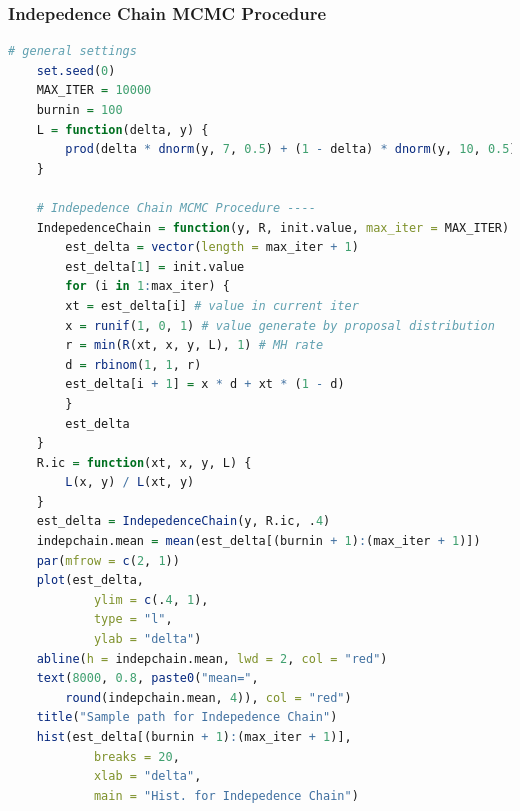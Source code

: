 \documentclass[11pt]{article}
\begin{document}
\subsubsection{Indepedence Chain MCMC Procedure}\label{sec:mhic}
\begin{lstlisting}[language=R] 
    # general settings
    set.seed(0)
    MAX_ITER = 10000
    burnin = 100
    L = function(delta, y) {
        prod(delta * dnorm(y, 7, 0.5) + (1 - delta) * dnorm(y, 10, 0.5))
    }

    # Indepedence Chain MCMC Procedure ----
    IndepedenceChain = function(y, R, init.value, max_iter = MAX_ITER) {
        est_delta = vector(length = max_iter + 1)
        est_delta[1] = init.value
        for (i in 1:max_iter) {
        xt = est_delta[i] # value in current iter
        x = runif(1, 0, 1) # value generate by proposal distribution
        r = min(R(xt, x, y, L), 1) # MH rate
        d = rbinom(1, 1, r)
        est_delta[i + 1] = x * d + xt * (1 - d)
        }
        est_delta
    }
    R.ic = function(xt, x, y, L) {
        L(x, y) / L(xt, y)
    }
    est_delta = IndepedenceChain(y, R.ic, .4)
    indepchain.mean = mean(est_delta[(burnin + 1):(max_iter + 1)])
    par(mfrow = c(2, 1))
    plot(est_delta,
            ylim = c(.4, 1),
            type = "l",
            ylab = "delta")
    abline(h = indepchain.mean, lwd = 2, col = "red")
    text(8000, 0.8, paste0("mean=", 
        round(indepchain.mean, 4)), col = "red")
    title("Sample path for Indepedence Chain")
    hist(est_delta[(burnin + 1):(max_iter + 1)],
            breaks = 20,
            xlab = "delta",
            main = "Hist. for Indepedence Chain")
\end{lstlisting}
\end{document}

